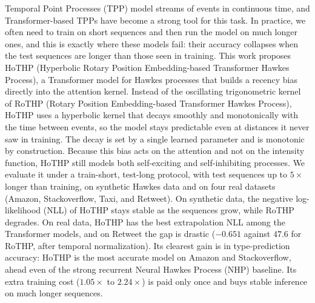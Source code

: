 Temporal Point Processes (\gls{TPP}) model streams of events in continuous time, and Transformer-based TPPs have become a strong tool for this task. In practice, we often need to train on short sequences and then run the model on much longer ones, and this is exactly where these models fail: their accuracy collapses when the test sequences are longer than those seen in training. This work proposes HoTHP (Hyperbolic Rotary Position Embedding-based Transformer Hawkes Process), a Transformer model for Hawkes processes that builds a recency bias directly into the attention kernel. Instead of the oscillating trigonometric kernel of RoTHP (Rotary Position Embedding-based Transformer Hawkes Process), HoTHP uses a hyperbolic kernel that decays smoothly and monotonically with the time between events, so the model stays predictable even at distances it never saw in training. The decay is set by a single learned parameter and is monotonic by construction. Because this bias acts on the attention and not on the intensity function, HoTHP still models both self-exciting and self-inhibiting processes. We evaluate it under a train-short, test-long protocol, with test sequences up to $5\times$ longer than training, on synthetic Hawkes data and on four real datasets (Amazon, Stackoverflow, Taxi, and Retweet). On synthetic data, the negative log-likelihood (\gls{NLL}) of HoTHP stays stable as the sequences grow, while RoTHP degrades. On real data, HoTHP has the best extrapolation NLL among the Transformer models, and on Retweet the gap is drastic ($-0.651$ against $47.6$ for RoTHP, after temporal normalization). Its clearest gain is in type-prediction accuracy: HoTHP is the most accurate model on Amazon and Stackoverflow, ahead even of the strong recurrent Neural Hawkes Process (NHP) baseline. Its extra training cost ($1.05\times$ to $2.24\times$) is paid only once and buys stable inference on much longer sequences.

